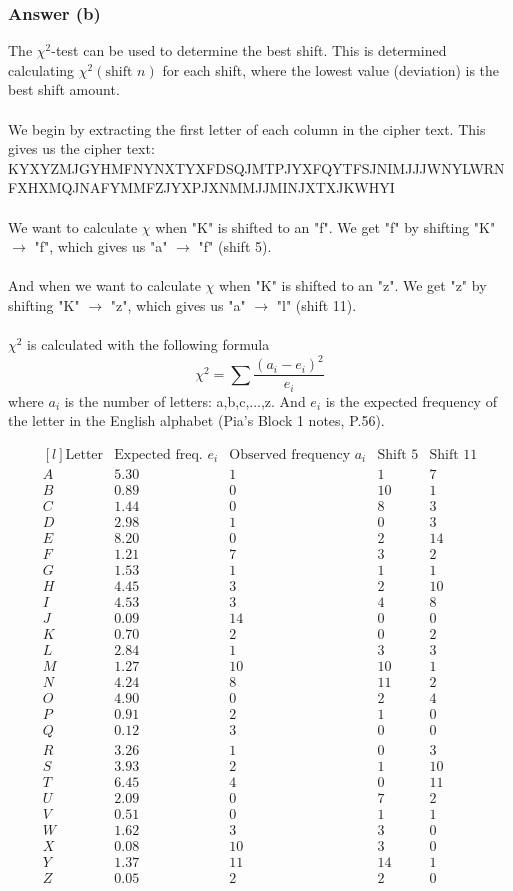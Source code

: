 \documentclass{article}
\begin{document}
	\subsubsection*{Answer (b)}
	The $\chi^2$-test can be used to determine the best shift. This is determined calculating $\chi^2(\text{shift } n)$ for each shift, where the lowest value (deviation) is the best shift amount.  
	\\\\
	We begin by extracting the first letter of each column in the cipher text. This gives us the cipher text: 
	KYXYZMJGYHMFNYNXTYXFDSQJMTPJYXFQYTFSJNIMJJJWNYLWRNFXHXMQJNAFYMMFZJYXPJXNMMJJMINJXTXJKWHYI
	\\\\
	We want to calculate $\chi$ when "K" is shifted to an "f". We get "f" by shifting "K" $\rightarrow$ "f", which gives us "a" $\rightarrow$ "f" (shift 5). 
	\\\\
	And when we want to calculate $\chi$ when "K" is shifted to an "z". We get "z" by shifting "K" $\rightarrow$ "z", which gives us "a" $\rightarrow$ "l" (shift 11). 
	\\\\
	$\chi^2$ is calculated with the following formula
	$$
	\chi^2=\sum\frac{(a_i-e_i)^2}{e_i}
	$$
	where $a_i$ is the number of letters: a,b,c,...,z. And $e_i$ is the expected frequency of the letter in the English alphabet (Pia's Block 1 notes, P.56).

	\[
	 \begin{matrix*}[l]
	 \text{Letter} & \text{Expected freq. } e_i & \text{Observed frequency } a_i & \text{Shift 5} & \text{Shift 11} \\
	A&5.30&1&1&7 \\
	B&0.89&0&10&1\\
	C&1.44&0&8&3\\
	D&2.98&1&0&3\\
	E&8.20&0&2&14\\
	F&1.21&7&3&2\\
	G&1.53&1&1&1\\
	H&4.45&3&2&10\\
	I&4.53&3&4&8\\
	J&0.09&14&0&0\\
	K&0.70&2&0&2\\
	L&2.84&1&3&3\\
	M&1.27&10&10&1\\
	N&4.24&8&11&2\\
	O&4.90&0&2&4\\
	P&0.91&2&1&0\\
	Q&0.12&3&0&0\\
	R&3.26&1&0&3\\
	S&3.93&2&1&10\\
	T&6.45&4&0&11\\
	U&2.09&0&7&2\\
	V&0.51&0&1&1\\
	W&1.62&3&3&0\\
	X&0.08&10&3&0\\
	Y&1.37&11&14&1\\
	Z&0.05&2&2&0
	\end{matrix*}
	\]
	
\end{document}
